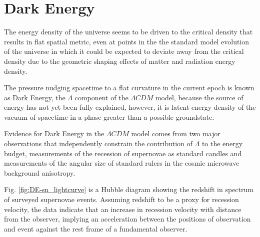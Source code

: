 \documentclass{paper}
\begin{document}
\section{Dark Energy}
  The energy density of the universe seems to be driven to the critical 
  density that results in flat spatial metric, even at points in the
  the standard model evolution of the universe in which it could be expected
  to deviate away from the critical density due to the geometric shaping 
  effects of matter and radiation energy density.

  The pressure nudging spacetime to a flat curvature in the current epoch is 
  known as Dark Energy, the \(\Lambda\) component of the \(\Lambda CDM\)
  model, because the source of energy has not yet been fully explained, 
  however, it is latent energy density of the vacuum of spacetime in a phase
  greater than a possible groundstate.

  Evidence for Dark Energy in the \(\Lambda CDM\) model comes from two major
  observations that independently constrain the contribution of \(\Lambda\) 
  to the energy budget, measurements of the recession of supernovae as 
  standard candles and measurements of the angular size of standard rulers in 
  the cosmic microwave background anisotropy.

  Fig. \ref{fig:DE-sn_lightcurve} is a Hubble diagram showing the redshift in
  spectrum of surveyed supernovae events. Assuming redshift to be a proxy for
  recession velocity, the data indicate that an increase in recession 
  velocity with distance from the observer, implying an acceleration between
  the positions of observation and event against the rest frame of a
  fundamental observer.
\end{document}
